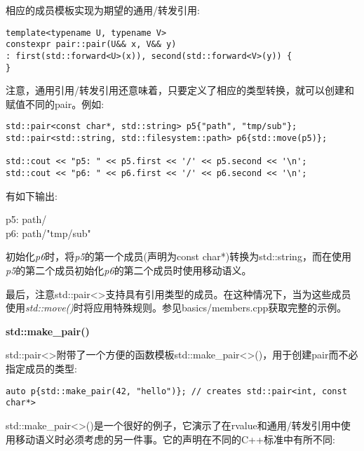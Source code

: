 相应的成员模板实现为期望的通用/转发引用:\par

\begin{lstlisting}[caption={}]
template<typename U, typename V>
constexpr pair::pair(U&& x, V&& y)
: first(std::forward<U>(x)), second(std::forward<V>(y)) {
}
\end{lstlisting}

注意，通用引用/转发引用还意味着，只要定义了相应的类型转换，就可以创建和赋值不同的pair。例如:\par

\begin{lstlisting}[caption={}]
std::pair<const char*, std::string> p5{"path", "tmp/sub"};
std::pair<std::string, std::filesystem::path> p6{std::move(p5)};

std::cout << "p5: " << p5.first << '/' << p5.second << '\n';
std::cout << "p6: " << p6.first << '/' << p6.second << '\n';
\end{lstlisting}

有如下输出:\par

\begin{tcolorbox}[colback=white,colframe=black]
p5: path/ \\
p6: path/"tmp/sub"
\end{tcolorbox}

初始化\textit{p6}时，将\textit{p5}的第一个成员(声明为const char*)转换为std::string，而在使用\textit{p5}的第二个成员初始化\textit{p6}的第二个成员时使用移动语义。\par

最后，注意std::pair<>支持具有引用类型的成员。在这种情况下，当为这些成员使用\textit{std::move()}时将应用特殊规则。参见basics/members.cpp获取完整的示例。\par

\hspace*{\fill} \par %
\textbf{std::make\_pair()}

std::pair<>附带了一个方便的函数模板std::make\_pair<>()，用于创建pair而不必指定成员的类型:\par

\begin{lstlisting}[caption={}]
auto p{std::make_pair(42, "hello")}; // creates std::pair<int, const char*>
\end{lstlisting}

std::make\_pair<>()是一个很好的例子，它演示了在rvalue和通用/转发引用中使用移动语义时必须考虑的另一件事。它的声明在不同的C++标准中有所不同:\par

